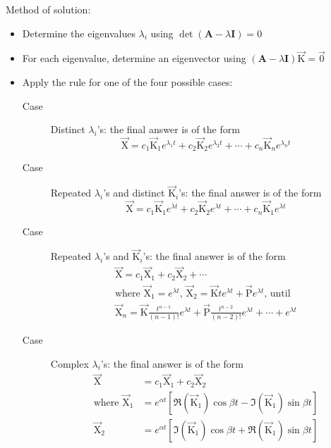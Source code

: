 \documentclass[10pt, twocolumn]{article}
\theoremstyle{definition}
\begin{document}
Method of solution:
\begin{itemize}
  \item Determine the eigenvalues \(\lambda_i \) using \(\det(\mathbf{A} - \lambda\mathbf{I}) = 0\)
  \item For each eigenvalue, determine an eigenvector using \((\mathbf{A} - \lambda\mathbf{I})\vec{\mathrm{K}} = \vec{0}\)
  \item Apply the rule for one of the four possible cases:
        \begin{description}
          \item[Case ] Distinct \(\lambda_i \)'s: the final answer is of the form
                \[
                  \vec{\mathrm{X}} = c_1 \vec{\mathrm{K}}_1 e^{\lambda_1 t} + c_2 \vec{\mathrm{K}}_2 e^{\lambda_2 t} + \cdots + c_n \vec{\mathrm{K}}_n e^{\lambda_n t}
                \]
          \item[Case ] Repeated \(\lambda_i \)'s and distinct \(\vec{\mathrm{K}}_i \)'s: the final answer is of the form
                \[
                  \vec{\mathrm{X}} = c_1 \vec{\mathrm{K}}_1 e^{\lambda t} + c_2 \vec{\mathrm{K}}_2 e^{\lambda t} + \cdots + c_n \vec{\mathrm{K}}_1 e^{\lambda t}
                \]
          \item[Case ] Repeated \(\lambda_i \)'s and \(\vec{\mathrm{K}}_i \)'s: the final answer is of the form
                \begin{gather*}
                  \vec{\mathrm{X}} = c_1 \vec{\mathrm{X}}_1 + c_2 \vec{\mathrm{X}}_2 + \cdots \\
                  \text{where } \vec{\mathrm{X}}_1 = e^{\lambda t} \text{, } \vec{\mathrm{X}}_2 = \vec{\mathrm{K}}te^{\lambda t} + \vec{\mathrm{P}}e^{\lambda t} \text{, until}\\
                  \vec{\mathrm{X}}_n = \vec{\mathrm{K}}\frac{t^{n - 1}}{(n - 1)!}e^{\lambda t} + \vec{\mathrm{P}}\frac{t^{n - 2}}{(n - 2)!}e^{\lambda t}  + \cdots + e^{\lambda t}
                \end{gather*}
          \item[Case ] Complex \(\lambda_i \)'s: the final answer is of the form
                \begin{align*}
                  \vec{\mathrm{X}}                 & = c_1 \vec{\mathrm{X}}_1 + c_2 \vec{\mathrm{X}}_2                                                                                  \\
                  \text{where } \vec{\mathrm{X}}_1 & = e^{\alpha t}\left[ \Re\left( \vec{\mathrm{K}}_1 \right)\cos{\beta t} - \Im\left( \vec{\mathrm{K}}_1 \right)\sin{\beta t} \right] \\
                  \vec{\mathrm{X}}_2               & = e^{\alpha t}\left[ \Im\left( \vec{\mathrm{K}}_1 \right)\cos{\beta t} + \Re\left( \vec{\mathrm{K}}_1 \right)\sin{\beta t} \right] \\
                \end{align*}
        \end{description}
\end{itemize}
\end{document}
